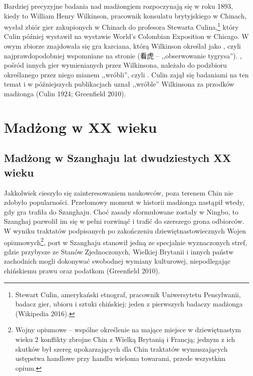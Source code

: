 Bardziej precyzyjne badania nad madżongiem rozpoczynają się w roku 1893, kiedy
to William Henry Wilkinson, pracownik konsulatu brytyjskiego w Chinach, wysłał
zbiór gier zakupionych w Chinach do profesora Stewarta Culina,\footnote{Stewart
Culin, amerykański etnograf, pracownik Uniwersytetu Pensylwanii, badacz gier,
ubioru i sztuki chińskiej; jeden z pierwszych badaczy madżonga (Wikipedia
2016).} który Culin później wystawił na wystawie World's Colombian Exposition w
Chicago. W owym zbiorze znajdowała się gra karciana, którą Wilkinson określał
jako , czyli najprawdopodobniej wspomniane na stronie
\pageref{kanhu}  (看虎  -- ,,obserwowanie tygrysa'').
, pośród innych gier wymienianych przez Wilkinsona, należało do
podzbioru określanego przez niego mianem ,,wróbli'', czyli . Culin
zajął się badaniami na ten temat i w późniejszych publikacjach uznał ,,wróble''
Wilkinsona za przodków madżonga (Culin 1924; Greenfield 2010).

\section{Madżong w XX wieku}

\subsection{Madżong w Szanghaju lat dwudziestych XX wieku}
Jakkolwiek  cieszyło się zainteresowaniem naukowców, poza
terenem Chin nie zdobyło popularności. Przełomowy moment w historii madżonga nastąpił wtedy,
gdy gra trafiła do Szanghaju. Choć zasady sformułowane zostały w Ningbo, to
Szanghaj pozwolił im się w pełni rozwinąć i trafić do szerszego grona odbiorców.
W wyniku traktatów podpisanych po zakończeniu dziewiętnastowiecznych Wojen
opiumowych\footnote{Wojny opiumowe – wspólne określenie na mające miejsce w
dziewiętnastym wieku 2 konflikty zbrojne Chin z Wielką Brytanią i Francją;
jednym z ich skutków był szereg upokarzających dla Chin traktatów wymuszających
ustępstwa handlowe przy handlu wieloma towarami, przede wszystkim opium.}, port
w Szanghaju stanowił jedną ze specjalnie wyznaczonych stref, gdzie przybysze ze
Stanów Zjednoczonych, Wielkiej Brytanii i innych państw zachodnich mogli
dokonywać swobodnej wymiany kulturowej, niepodlegając chińskiemu prawu oraz
podatkom (Greenfield 2010).

